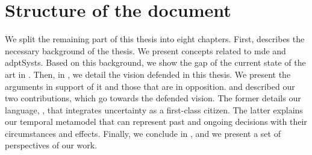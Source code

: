 \section{Structure of the document}

We split the remaining part of this thesis into eight chapters.
First,  describes the necessary background of the thesis.
We present concepts related to \gls{mde} and \glspl{adptSyst}.
Based on this background, we show the gap of the current state of the art in .
Then, in , we detail the vision defended in this thesis.
We present the arguments in support of it and those that are in opposition.
 and  described our two contributions, which go towards the defended vision.
The former details our language, \langName, that integrates uncertainty as a first-class citizen.
The latter explains our temporal metamodel that can represent past and ongoing decisions with their circumstances and effects.
Finally, we conclude in , and we present a set of perspectives of our work.